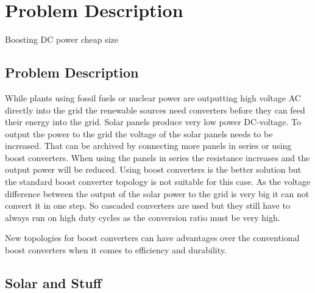 \chapter{Problem Description}\label{ch:probdesc}
Boosting DC power
cheap
size


\section{Problem Description}
While plants using fossil fuels or nuclear power are outputting high voltage AC directly into the grid the renewable sources need converters before they can feed their energy into the grid.
Solar panels produce very low power DC-voltage.
To output the power to the grid the voltage of the solar panels needs to be increased.
That can be archived by connecting more panels in series or using boost converters.
When using the panels in series the resistance increases and the output power will be reduced.
%
Using boost converters is the better solution but the standard boost converter topology is not suitable for this case.
As the voltage difference between the output of the solar power to the grid is very big it can not convert it in one step.
So cascaded converters are used but they still have to always run on high duty cycles as the conversion ratio must be very high. 

New topologies for boost converters can have advantages over the conventional boost converters when it comes to efficiency and durability.

\section{Solar and Stuff}